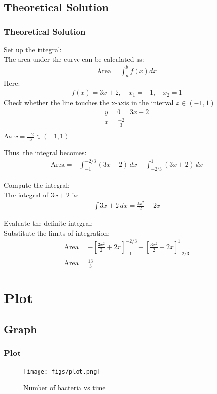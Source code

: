 \documentclass{beamer}
\providecommand{\sbrak}[1]{\ensuremath{{}\left[#1\right]}}
\providecommand{\brak}[1]{\ensuremath{\left(#1\right)}}
\theoremstyle{remark}
\numberwithin{equation}{section}
\begin{document}
\subsection{Theoretical Solution}
\begin{frame}
\frametitle{Theoretical Solution}
    Set up the integral: \\
    The area under the curve can be calculated as:
    \begin{align}
          \text{Area}=\int_{a}^{b}f(x)dx
    \end{align}
     Here:
    \begin{align}
    f(x) = 3x+2, \quad x_1 = -1, \quad x_2 = 1
    \end{align}
    Check whether the line touches the x-axis in the interval $x\in\brak{-1,1}$ \\
    \begin{align}
        y=0=3x+2\\
        x=\frac{-2}{3}\\
    \end{align}
    As $x=\frac{-2}{3}\in \brak{-1,1}$
\end{frame}
\begin{frame}
    Thus, the integral becomes:
    \begin{align}
    \text{Area} = -\int_{-1}^{-2/3} (3x+2)  \, dx+\int_{-2/3}^{1} (3x+2) \, dx
    \end{align}
    \item Compute the integral: \\
    The integral of $3x+2$ is:
    \begin{align}
    \int 3x+2 \, dx = \frac{3x^2}{2}+2x
    \end{align}
    \item Evaluate the definite integral: \\
    Substitute the limits of integration:
    \begin{align}
    \text{Area} = -\sbrak{\frac{3x^2}{2}+2x}_{-1}^{-2/3}+\sbrak{\frac{3x^2}{2}+2x}_{-2/3}^{1} \\
    \text{Area} = \frac{13}{3}
    \end{align}
\end{frame}
\section{Plot}
\subsection{Graph}
\begin{frame}[fragile]
\frametitle{Plot}
    \begin{figure}[htbp] %
    \centering
    \texttt{[image: figs/plot.png]} %
    \caption{Number of bacteria vs time}
\end{figure}
\end{frame}
\end{document}
